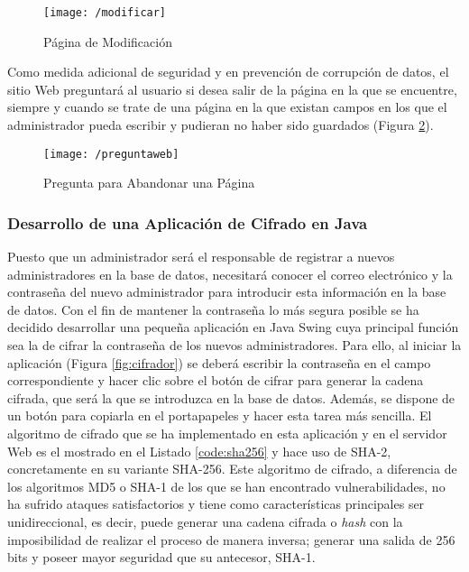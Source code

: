 \clearpage

\begin{figure}[!h]
	\begin{center}
		\texttt{[image: /modificar]}
		\caption{Página de Modificación}
		\label{fig:modificar}
	\end{center}
\end{figure}

Como medida adicional de seguridad y en prevención de corrupción de datos, el sitio Web preguntará al usuario si desea salir de la página en la que se encuentre, siempre y cuando se trate de una página en la que existan campos en los que el administrador pueda escribir y pudieran no haber sido guardados (Figura \ref{fig:preguntaweb}).

\begin{figure}[!h]
	\begin{center}
		\texttt{[image: /preguntaweb]}
		\caption{Pregunta para Abandonar una Página}
		\label{fig:preguntaweb}
	\end{center}
\end{figure}

\clearpage

\subsubsection{Desarrollo de una Aplicación de Cifrado en Java}
Puesto que un administrador será el responsable de registrar a nuevos administradores en la base de datos, necesitará conocer el correo electrónico y la contraseña del nuevo administrador para introducir esta información en la base de datos. Con el fin de mantener la contraseña lo más segura posible se ha decidido desarrollar una pequeña aplicación en Java Swing cuya principal función sea la de cifrar la contraseña de los nuevos administradores. Para ello, al iniciar la aplicación (Figura \ref{fig:cifrador}) se deberá escribir la contraseña en el campo correspondiente y hacer clic sobre el botón de cifrar para generar la cadena cifrada, que será la que se introduzca en la base de datos. Además, se dispone de un botón para copiarla en el portapapeles y hacer esta tarea más sencilla. El algoritmo de cifrado que se ha implementado en esta aplicación y en el servidor Web es el mostrado en el Listado \ref{code:sha256} y hace uso de SHA-2, concretamente en su variante SHA-256. Este algoritmo de cifrado, a diferencia de los algoritmos MD5 o SHA-1 de los que se han encontrado vulnerabilidades, no ha sufrido ataques satisfactorios y tiene como características principales ser unidireccional, es decir, puede generar una cadena cifrada o \textit{hash} con la imposibilidad de realizar el proceso de manera inversa; generar una salida de 256 bits y poseer mayor seguridad que su antecesor, SHA-1.

